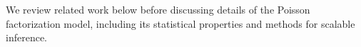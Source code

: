


We review related work below before discussing details of the Poisson
factorization model, including its statistical properties and methods
for scalable inference.








